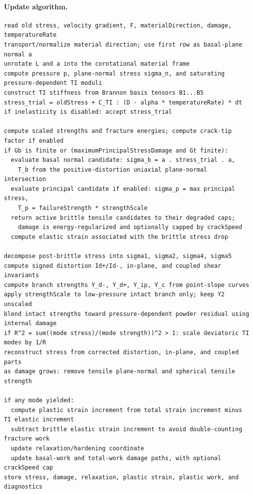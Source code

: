\paragraph{Update algorithm.}
\begin{lstlisting}[caption={Graphite constitutive update structure.},label={alg:graphite-update},basicstyle=\ttfamily\small]
read old stress, velocity gradient, F, materialDirection, damage, temperatureRate
transport/normalize material direction; use first row as basal-plane normal a
unrotate L and a into the corotational material frame
compute pressure p, plane-normal stress sigma_n, and saturating pressure-dependent TI moduli
construct TI stiffness from Brannon basis tensors B1...B5
stress_trial = oldStress + C_TI : (D - alpha * temperatureRate) * dt
if inelasticity is disabled: accept stress_trial

compute scaled strengths and fracture energies; compute crack-tip factor if enabled
if Gb is finite or (maximumPrincipalStressDamage and Gt finite):
  evaluate basal normal candidate: sigma_b = a . stress_trial . a,
    T_b from the positive-distortion uniaxial plane-normal intersection
  evaluate principal candidate if enabled: sigma_p = max principal stress,
    T_p = failureStrength * strengthScale
  return active brittle tensile candidates to their degraded caps;
    damage is energy-regularized and optionally capped by crackSpeed
  compute elastic strain associated with the brittle stress drop

decompose post-brittle stress into sigma1, sigma2, sigma4, sigma5
compute signed distortion Id+/Id-, in-plane, and coupled shear invariants
compute branch strengths Y_d-, Y_d+, Y_ip, Y_c from point-slope curves
apply strengthScale to low-pressure intact branch only; keep Y2 unscaled
blend intact strengths toward pressure-dependent powder residual using internal damage
if R^2 = sum((mode stress)/(mode strength))^2 > 1: scale deviatoric TI modes by 1/R
reconstruct stress from corrected distortion, in-plane, and coupled parts
as damage grows: remove tensile plane-normal and spherical tensile strength

if any mode yielded:
  compute plastic strain increment from total strain increment minus TI elastic increment
  subtract brittle elastic strain increment to avoid double-counting fracture work
  update relaxation/hardening coordinate
  update basal-work and total-work damage paths, with optional crackSpeed cap
store stress, damage, relaxation, plastic strain, plastic work, and diagnostics
\end{lstlisting}

